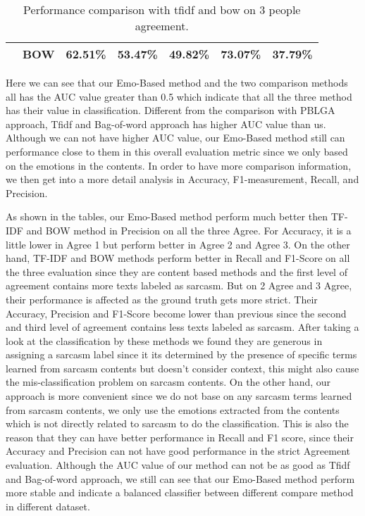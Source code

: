 \documentclass[12pt,a4paper]{report}
\theoremstyle{definition}
\begin{document}
\begin{CJK}{UTF8}{bsmi}
\begin{table}[H]
\begin{tabular}{l | l | l | l | l | l | l}
                 & BOW & 62.51\% & 53.47\% & 49.82\% & 73.07\% & 37.79\%\\
                \hline
            \end{tabular}
            \caption{Performance comparison with tfidf and bow on 3 people agreement.}
            \label{tab:tfidf_bow_agree3}
        \end{table}
        \par Here we can see that our Emo-Based method and the two comparison methods all has the AUC value greater than 0.5 which indicate that all the three method has their value in classification.
        Different from the comparison with PBLGA approach, Tfidf and Bag-of-word approach has higher AUC value than us. Although we can not have higher AUC value, our Emo-Based method still can performance close to them in this overall evaluation metric since we only based on the emotions in the contents.
        In order to have more  comparison information, we then get into a more detail analysis in Accuracy, F1-measurement, Recall, and Precision.
        \par As shown in the tables, our Emo-Based method perform much better then TF-IDF and BOW method in Precision on all the three Agree.
        For Accuracy, it is a little lower in Agree 1 but perform better in Agree 2 and Agree 3.
        On the other hand, TF-IDF and BOW methods perform better in Recall and F1-Score on all the three evaluation since they are content based methods and the first level of agreement contains more texts labeled as sarcasm. But on 2 Agree and 3 Agree, their performance is affected as the ground truth gets more strict. Their Accuracy, Precision and F1-Score become lower than previous since the second and third level of agreement contains less texts labeled as sarcasm. After taking a look at the classification by these methods we found they are generous in assigning a sarcasm label since it its determined by the presence of specific terms learned from sarcasm contents but doesn't consider context, this might also cause the mis-classification problem on sarcasm contents. On the other hand, our approach is more convenient since we do not base on any sarcasm terms learned from sarcasm contents, we only use the emotions extracted from the contents which is not directly related to sarcasm to do the classification.
        This is also the reason that they can have better performance in Recall and F1 score, since their Accuracy and Precision can not have good performance in the strict Agreement evaluation.
        Although the AUC value of our method can not be as good as Tfidf and Bag-of-word approach, we still can see that our Emo-Based method perform more stable and indicate a balanced classifier between different compare method in different  dataset.

\end{CJK}
\end{document}

